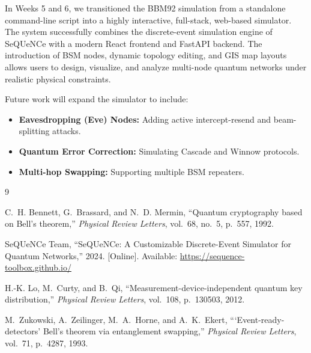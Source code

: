 \documentclass[12pt,oneside,letterpaper,english]{article}
\begin{document}
In Weeks 5 and 6, we transitioned the BBM92 simulation from a standalone command-line script into a highly interactive, full-stack, web-based simulator. The system successfully combines the discrete-event simulation engine of SeQUeNCe with a modern React frontend and FastAPI backend. The introduction of BSM nodes, dynamic topology editing, and GIS map layouts allows users to design, visualize, and analyze multi-node quantum networks under realistic physical constraints. 

Future work will expand the simulator to include:
\begin{itemize}
    \item \textbf{Eavesdropping (Eve) Nodes:} Adding active intercept-resend and beam-splitting attacks.
    \item \textbf{Quantum Error Correction:} Simulating Cascade and Winnow protocols.
    \item \textbf{Multi-hop Swapping:} Supporting multiple BSM repeaters.
\end{itemize}

\newpage
{}
\begin{thebibliography}{9}

C.~H. Bennett, G.~Brassard, and N.~D. Mermin,
``Quantum cryptography based on Bell's theorem,''
\textit{Physical Review Letters}, vol.~68, no.~5, p.~557, 1992.

SeQUeNCe Team,
``SeQUeNCe: A Customizable Discrete-Event Simulator for Quantum Networks,'' 2024.
[Online]. Available: \url{https://sequence-toolbox.github.io/}

H.-K. Lo, M.~Curty, and B.~Qi,
``Measurement-device-independent quantum key distribution,''
\textit{Physical Review Letters}, vol.~108, p.~130503, 2012.

M.~Zukowski, A.~Zeilinger, M.~A.~Horne, and A.~K.~Ekert,
```Event-ready-detectors' Bell's theorem via entanglement swapping,''
\textit{Physical Review Letters}, vol.~71, p.~4287, 1993.

\end{thebibliography}
\end{document}
